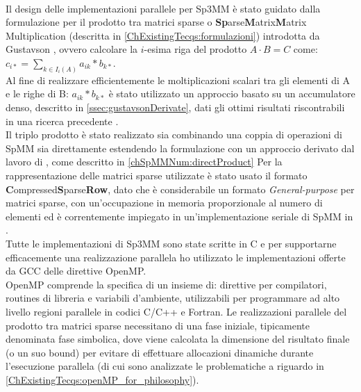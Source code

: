 \\
Il design delle implementazioni parallele per Sp3MM è stato guidato dalla formulazione \rowbyrow per il prodotto tra matrici sparse o
{\bf{Sp}}arse{\bf{M}}atrix{\bf{M}}atrix Multiplication (descritta in \ref{ChExistingTecqs:formulazioni}) introdotta da Gustavson \cite{gustavson},
ovvero calcolare la $i$-esima riga del prodotto $A\cdot B = C$ come:	$c_{i*} = \sum\limits_{k \in I_i(A)}  a_{ik} \ast  b_{k*}$.\\
Al fine di realizzare efficientemente le moltiplicazioni scalari tra gli elementi di A e le righe di B: $a_{ik} \ast  b_{k*}$
è stato utilizzato un approccio basato su un accumulatore denso, descritto in \ref{ssec:gustavsonDerivate}, 
dati gli ottimi risultati riscontrabili in una ricerca precedente \cite{intelSpMMDenseAccumulator}.\\
Il triplo prodotto è stato realizzato sia combinando una coppia di operazioni di SpMM sia direttamente
estendendo la formulazione \rowbyrow con un approccio derivato dal lavoro di \cite{Sp3MM4AMG}, come descritto in \ref{chSpMMNum:directProduct}
\voidLine
Per la rappresentazione delle matrici sparse utilizzate è stato usato il formato {\bf{C}}ompressed{\bf{S}}parse{\bf{R}ow},
dato che 
è considerabile un formato \emph{General-purpose} per matrici sparse, con un'occupazione in memoria proporzionale al numero di elementi \nnz 
ed è correntemente impiegato in un'implementazione seriale di SpMM in .\\
Tutte le implementazioni di Sp3MM sono state scritte in C
e per supportarne efficacemente una realizzazione parallela ho utilizzato le implementazioni offerte da GCC delle direttive OpenMP.\\
OpenMP comprende la specifica di un insieme di: 
direttive per compilatori, routines di libreria e variabili d'ambiente, utilizzabili per programmare ad alto livello regioni parallele in codici C/C++ e Fortran.
\voidLine
Le realizzazioni parallele del prodotto tra matrici sparse necessitano di una fase iniziale, tipicamente denominata fase simbolica,
dove viene calcolata la dimensione del risultato finale (o un suo bound) per evitare di effettuare allocazioni dinamiche 
durante l'esecuzione parallela (di cui sono analizzate le problematiche a riguardo in \ref{ChExistingTecqs:openMP_for_philosophy}).
